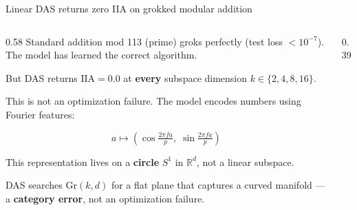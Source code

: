 \documentclass[aspectratio=169,11pt]{beamer}
\newcommand{\Gr}{\mathrm{Gr}}
\newcommand{\IIA}{\mathrm{IIA}}
\newcommand{\R}{\mathbb{R}}
\begin{document}
\begin{frame}{Linear DAS returns zero IIA on grokked modular addition}

\begin{columns}[T]
\begin{column}{0.58\textwidth}
{\small Standard addition mod 113 (prime) groks perfectly (test loss $< 10^{-7}$). The model has learned the correct algorithm.}

\vspace{0.3em}
{\small But DAS returns $\IIA = 0.0$ at \textbf{every} subspace dimension $k \in \{2, 4, 8, 16\}$.}

\vspace{0.3em}
{\small This is not an optimization failure. The model encodes numbers using Fourier features:}

\vspace{-4pt}
{\small $$a \mapsto (\cos \tfrac{2\pi f a}{p},\; \sin \tfrac{2\pi f a}{p})$$}

\vspace{-6pt}
{\small This representation lives on a \textbf{circle} $S^1$ in $\R^d$, not a linear subspace.}

\vspace{0.2em}
{\small DAS searches $\Gr(k,d)$ for a flat plane that captures a curved manifold --- a \textbf{category error}, not an optimization failure.}
\end{column}
\begin{column}{0.39\textwidth}
\end{column}
\end{columns}
\end{frame}
\end{document}
